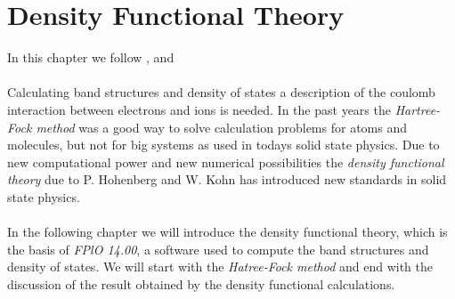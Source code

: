 \chapter{Density Functional Theory}
	In this chapter we follow \cite{DFTWIEN2k}, \cite{DFTValenti} and \cite{DFTEngel}\\\\
	Calculating band structures and density of states a description of the coulomb interaction between electrons and ions is needed. In the past years the \textit{Hartree-Fock method} was a good way to solve calculation problems for atoms and molecules, but not for big systems as used in todays solid state physics. Due to new computational power and new numerical possibilities the \textit{density functional theory} due to P. Hohenberg and W. Kohn \cite{HohenbergKohn} has introduced new standards in solid state physics. \\\\		
	In the following chapter we will introduce the density functional theory, which is the basis of \textit{FPlO 14.00}, a software used to compute the band structures and density of states. We will start with the \textit{Hatree-Fock method} and end with the discussion of the result obtained by the density functional calculations.
	

